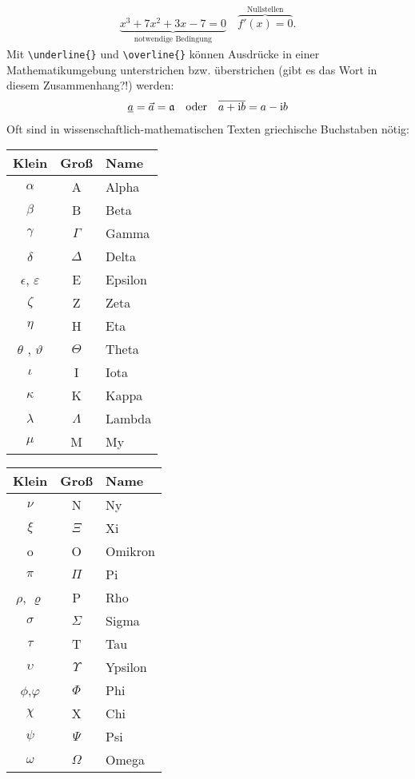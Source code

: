 \begin{align}
\underbrace{x^3 + 7x^2 + 3x -7 = 0}_{\text{notwendige Bedingung}}  \quad \overbrace{f'(x) = 0}^{\text{Nullstellen}}.
\end{align}	
%		
Mit {\lstinline!\underline{}!} und {\lstinline!\overline{}!} können Ausdrücke in einer Mathematikumgebung unterstrichen bzw. überstrichen (gibt es das Wort in diesem Zusammenhang?!) werden:
%
\begin{align*}
\underline{a} = \vec{a} = \frak{a} \quad \text{oder} \quad \overline{a + \text{i} b} = a - \text{i} b
\end{align*}
%
Oft sind in wissenschaftlich-mathematischen Texten griechische Buchstaben nötig:
%

\begin{minipage}{.45\textwidth}
\centering

\begin{tabular}{ccl} \toprule
Klein & Groß & Name \\ \midrule
$\alpha$ & \textrm{A} & Alpha \\    
$\beta$ & \textrm{B} & Beta \\  
$\gamma$ & $\Gamma$ & Gamma \\  
$\delta$ & $\Delta$ & Delta \\ 
$\epsilon$, $\varepsilon$ & \textrm{E} & Epsilon \\
$\zeta$ & \textrm{Z} & Zeta \\
$\eta$ & \textrm{H} & Eta  \\
$\theta$ , $\vartheta$ & $\Theta$ & Theta \\
$\iota$ & \textrm{I} & Iota \\
$\kappa$ & \textrm{K} & Kappa \\
$\lambda$ & $\Lambda$ & Lambda \\
$\mu$ & \textrm{M} & My \\ \bottomrule
\end{tabular}
\par\end{minipage}
%
\hfill
%
\begin{minipage}{.45\textwidth}
\centering
\begin{tabular}{ccl} \toprule
Klein & Groß & Name \\ \midrule
$\nu$ & \textrm{N} & Ny \\
$\xi$ & $\Xi$ & Xi \\
\textrm{o} & \textrm{O} & Omikron \\
$\pi$ & $\Pi$ & Pi \\
$\rho$, $\varrho$ & \textrm{P} & Rho \\
$\sigma$ & $\Sigma$ & Sigma  \\
$\tau$ & \textrm{T} & Tau \\
$\upsilon$ & $\Upsilon$ & Ypsilon \\
$\phi$,$\varphi$ & $\Phi$ & Phi \\
$\chi$ & \textrm{X} & Chi \\
$\psi$ & $\Psi$ & Psi \\
$\omega$ & $\Omega$ & Omega \\ \bottomrule
\end{tabular}
\par
\end{minipage}


